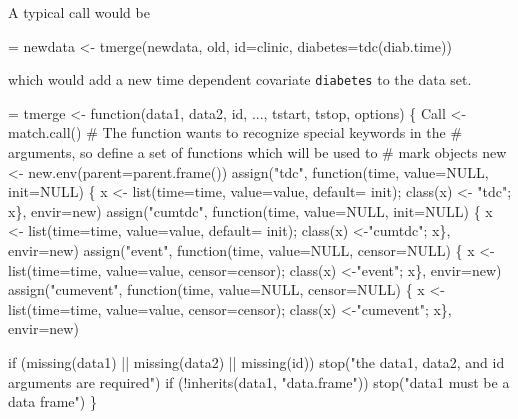 \documentclass{article}
\newcommand{\code}[1]{\texttt{#1}}
\begin{document}
A typical call would be
\begin{nwchunk}
=
  newdata <- tmerge(newdata, old, id=clinic, diabetes=tdc(diab.time))
\end{nwchunk}
which would add a new time dependent covariate \code{diabetes} to the
data set.

\begin{nwchunk}
=
 tmerge <- function(data1, data2, id, ..., tstart, tstop, options) \{
     Call <- match.call()
     # The function wants to recognize special keywords in the
     #  arguments, so define a set of functions which will be used to
     #  mark objects
     new <- new.env(parent=parent.frame())
     assign("tdc", function(time, value=NULL, init=NULL) \{
         x <- list(time=time, value=value, default= init); 
         class(x) <- "tdc"; x\},
            envir=new)
     assign("cumtdc", function(time, value=NULL, init=NULL) \{
         x <- list(time=time, value=value, default= init); 
         class(x) <-"cumtdc"; x\},
            envir=new)
     assign("event", function(time, value=NULL, censor=NULL) \{
         x <- list(time=time, value=value, censor=censor); 
         class(x) <-"event"; x\},
            envir=new)
     assign("cumevent", function(time, value=NULL, censor=NULL) \{
         x <- list(time=time, value=value, censor=censor); 
         class(x) <-"cumevent"; x\},
            envir=new)
 
     if (missing(data1) || missing(data2) || missing(id)) 
         stop("the data1, data2, and id arguments are required")
     if (!inherits(data1, "data.frame")) stop("data1 must be a data frame")
 \}
\end{nwchunk}
\end{document}
